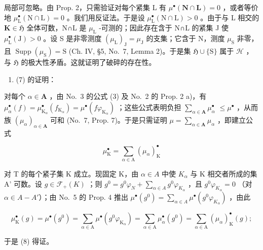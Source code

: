 局部可忽略。由 Prop. 2，只需验证对每个紧集 L 有 \(\mu^{\bullet}(\mathbf{N}\cap\mathbf{L})=0\) ，或者等价地 \(\mu_{\mathrm{L}}^{\bullet}(\mathrm{N}\cap\mathrm{L})=0\) 。我们用反证法。于是设 \(\mu_{\mathrm{L}}^{\bullet}(\mathrm{N}\cap\mathrm{L})>0\) 。由于与 L 相交的 \(\mathbf{K}\in\mathfrak{H}\) 全体可数，N∩L 是 \(\mu_{\mathrm{L}}\) -可测的；因此存在含于 N∩L 的紧集 J 使 \(\mu_{\mathrm{L}}^{\bullet}(\mathrm{J})>0\) 。设 S 是非零测度 \((\mu_{\mathrm{L}})_{\mathrm{J}}=\mu_{\mathrm{J}}\) 的支集；它含于 N，测度 \(\mu_{\mathrm{S}}\) 非零，且 \(\operatorname{Supp}(\mu_{\mathrm{S}})=\mathrm{S}\) (Ch. IV, §5, No.~7, Lemma 2)。于是集 \(\mathfrak{H}\cup\{\mathrm{S}\}\) 属于 \(\mathscr{H}\) ，与 \(\mathfrak{H}\) 的极大性矛盾。这就证明了破碎的存在性。

\begin{enumerate}
\def\labelenumi{\Alph{enumi})}
\setcounter{enumi}{1}
\tightlist
\item
  (7) 的证明：
\end{enumerate}

对每个 \(\alpha \in \mathbf{A}\) ，由 No.~3 的公式 (3) 及 No.~2 的 Prop. 2 a)，有 \(\mu_{\alpha}^{\bullet}(f) = \mu_{\mathrm{K}_{\alpha}}^{\bullet}(f_{\mathrm{K}_{\alpha}}) = \mu^{\bullet}(f\varphi_{\mathrm{K}_{\alpha}})\) ；这些公式表明负担 \(\sum_{\alpha \in \mathbf{A}} \mu_{\alpha}^{\bullet}\) \(\leqslant \mu^{\bullet}\) ，从而族 \((\mu_{\alpha})_{\alpha \in \mathbf{A}}\) 可和 (No.~7, Prop. 7)。于是只需证明 \(\mu = \sum_{\alpha \in \mathbf{A}} \mu_{\alpha}\) ，即建立公式

\[
\mu_ {\mathrm{K}} ^ {\bullet} = \sum_ {\alpha \in \mathrm{A}} (\mu_ {\alpha}) _ {\mathrm{K}} ^ {\bullet}\tag{8}
\]

对 T 的每个紧子集 K 成立。现固定 K，由 \(\alpha \in A\) 中使 \(K_{\alpha}\) 与 K 相交者所成的集 A' 可数。设 \(g \in \mathcal{F}_{+}(K)\) ；则 \(g^{0} = g^{0}\varphi_{N} + \sum_{\alpha \in A} g^{0}\varphi_{K_{\alpha}}\) ，且 \(g^{0}\varphi_{K_{\alpha}} = 0\) （对 \(\alpha \in A - A'\)）；由 No.~5 的 Prop. 4 推出 \(\mu^{\bullet}(g^{0}) = \sum_{\alpha \in A} \mu^{\bullet}(g^{0}\varphi_{K_{\alpha}})\) ，由此

\[
\mu_ {\mathrm{K}} ^ {\bullet} (g) = \mu^ {\bullet} (g ^ {0}) = \sum_ {\alpha \in \mathrm{A}} \mu^ {\bullet} (g ^ {0} \varphi_ {\mathrm{K} _ {\alpha}}) = \sum_ {\alpha \in \mathrm{A}} \mu_ {\alpha} ^ {\bullet} (g ^ {0}) = \sum_ {\alpha \in \mathrm{A}} (\mu_ {\alpha}) _ {\mathrm{K}} ^ {\bullet} (g);
\]

于是 (8) 得证。

